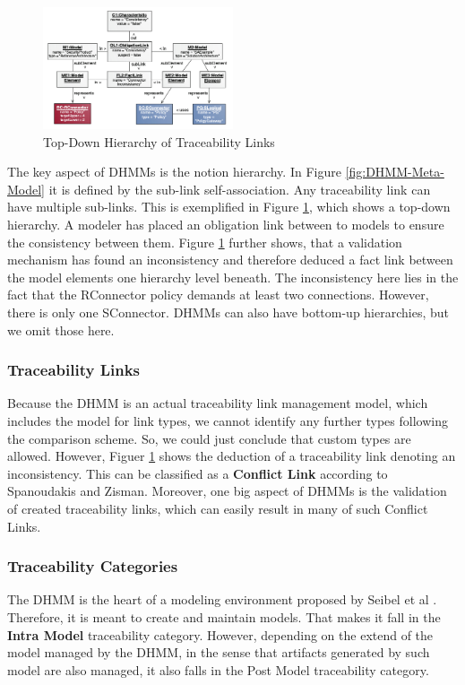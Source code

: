 \documentclass[runningheads,a4paper]{llncs}
\begin{document}
\begin{figure}
\centering
\includegraphics[width=0.5\textwidth]{dcmm-example.png}
\caption{Top-Down Hierarchy of Traceability Links \cite{DHMM}}
\label{fig:DHMM-Example}
\end{figure}

The key aspect of DHMMs is the notion hierarchy. 
In Figure \ref{fig:DHMM-Meta-Model} it is defined by the sub-link self-association.
Any traceability link can have multiple sub-links.
This is exemplified in Figure \ref{fig:DHMM-Example}, which shows a top-down hierarchy. 
A modeler has placed an obligation link between to models to ensure the consistency between them.
Figure \ref{fig:DHMM-Example} further shows, that a validation mechanism has found an inconsistency and therefore deduced a fact link between the model elements one hierarchy level beneath.
The inconsistency here lies in the fact that the RConnector policy demands at least two connections.
However, there is only one SConnector.
DHMMs can also have bottom-up hierarchies, but we omit those here.

\subsubsection{Traceability Links}
Because the DHMM is an actual traceability link management model, which includes the model for link types, we cannot identify any further types following the comparison scheme.
So, we could just conclude that custom types are allowed.
However, Figuer \ref{fig:DHMM-Example} shows the deduction of a traceability link denoting an inconsistency.
This can be classified as a \textbf{Conflict Link} according to Spanoudakis and Zisman.
Moreover, one big aspect of DHMMs is the validation of created traceability links, which can easily result in many of such Conflict Links.

\subsubsection{Traceability Categories}
The DHMM is the heart of a modeling environment proposed by Seibel et al \cite{DHMM}.
Therefore, it is meant to create and maintain models. 
That makes it fall in the \textbf{Intra Model} traceability category.
However, depending on the extend of the model managed by the DHMM, in the sense that artifacts generated by such model are also managed, it also falls in the Post Model traceability category.
\end{document}
